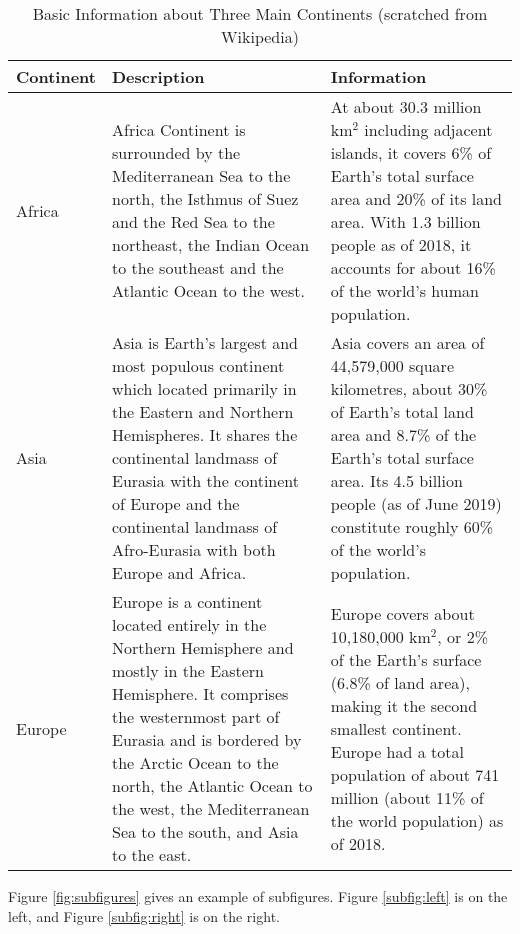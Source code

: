 \documentclass[12pt]{article}  %
\begin{document}
\begin{longtable}{ p{4em} p{14em} p{14em} }
\caption{Basic Information about Three Main Continents (scratched from Wikipedia)}
\label{tb:longtable}\\
\toprule
Continent & Description & Information \\
\midrule
Africa & Africa Continent is surrounded by the Mediterranean Sea to the
north, the Isthmus of Suez and the Red Sea to the northeast, the Indian
Ocean to the southeast and the Atlantic Ocean to the west. &
At about 30.3 million km$^2$ including adjacent islands, it covers 6\%
of Earth's total surface area and 20\% of its land area. With 1.3
billion people as of 2018, it accounts for about 16\% of the world's
human population. \\
\midrule
Asia & Asia is Earth's largest and most populous continent which
located primarily in the Eastern and Northern Hemispheres.
It shares the continental landmass of Eurasia with the continent
of Europe and the continental landmass of Afro-Eurasia with both
Europe and Africa. &
Asia covers an area of 44,579,000 square kilometres, about 30\%
of Earth's total land area and 8.7\% of the Earth's total surface
area. Its 4.5 billion people (as of June 2019) constitute roughly
60\% of the world's population. \\
\midrule
Europe & Europe is a continent located entirely in the Northern
Hemisphere and mostly in the Eastern Hemisphere. It comprises the
westernmost part of Eurasia and is bordered by the Arctic Ocean to
the north, the Atlantic Ocean to the west, the Mediterranean Sea to
the south, and Asia to the east. &
Europe covers about 10,180,000 km$^2$, or 2\% of the Earth's surface
(6.8\% of land area), making it the second smallest
continent. Europe had a total population of about 741 million (about
11\% of the world population) as of 2018. \\
\bottomrule
\end{longtable}

Figure \ref{fig:subfigures} gives an example of subfigures. Figure \ref{subfig:left} is on the left, and Figure \ref{subfig:right} is on the right.

\end{document}
